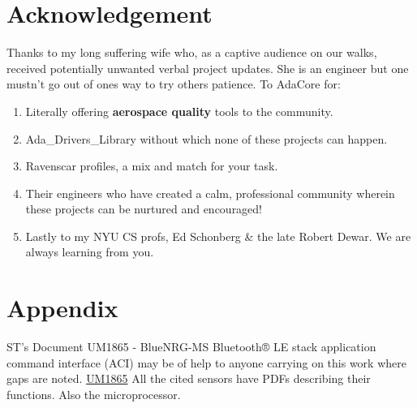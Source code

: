 \documentclass[11pt]{article}
\numberwithin{figure}{section}
\begin{document}
\section*{Acknowledgement}
Thanks to my long suffering wife who, as a captive audience on our
walks, received potentially unwanted verbal project updates. She is an
engineer but one mustn't go out of ones way to try others patience.
\newline
\newline
\noindent To AdaCore for:
\begin{enumerate}[label=(\alph*)]
\item Literally offering \textbf{aerospace quality} tools to the community.
\item Ada\_Drivers\_Library without which none of these projects can happen.
\item Ravenscar profiles, a mix and match for your task.
\item Their engineers who have created a calm, professional community
  wherein these projects can be nurtured and encouraged!
\item Lastly to my NYU CS profs, Ed Schonberg \& the late Robert
  Dewar. We are always learning from you.
\end{enumerate}

\section*{Appendix}
ST's Document UM1865 - BlueNRG-MS Bluetooth® LE stack application command interface
(ACI) may be of help to anyone carrying on this work where gaps are noted.
\href{https://www.st.com/content/ccc/resource/technical/document/user_manual/6d/a1/5b/6c/dc/ab/48/76/DM00162667.pdf/files/DM00162667.pdf/jcr:content/translations/en.DM00162667.pdf}{UM1865}
All the cited sensors have PDFs describing their functions. Also the microprocessor.
\end{document}
